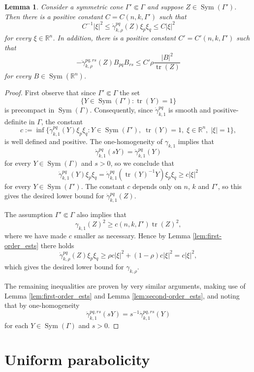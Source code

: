 \documentclass[12pt]{amsart}
\newtheorem{lemma}[theorem]{Lemma}
\DeclareMathOperator{\tr}{tr}
\DeclareMathOperator{\sym}{Sym}
\begin{document}
\begin{lemma}
\label{lem:improved_deriv_bds}
Consider a symmetric cone $\Gamma' \Subset \Gamma$ and suppose $Z \in \sym (\Gamma')$. Then there is a positive constant $C = C(n,k,\Gamma')$ such that 
\[C^{-1} |\xi|^2 \leq \dot \gamma_{k,\rho}^{pq}(Z) \xi_p \xi_q \leq C |\xi|^2\]
for every $\xi \in \mathbb{R}^n$. In addition, there is a positive constant $C' = C'(n,k,\Gamma')$ such that 
\[- \ddot \gamma_{k,\rho}^{pq,rs}(Z) B_{pq} B_{rs} \leq C' \rho\frac{|B|^2}{\tr(Z)}\]
for every $B \in \sym(\mathbb{R}^n)$.
\end{lemma}

\begin{proof}
First observe that since $\Gamma' \Subset \Gamma$ the set
\[ \{Y \in \sym ({\Gamma'}) : \tr(Y) = 1\}\]
is precompact in $\sym(\Gamma)$. Consequently, since $\dot \gamma_{k,1}^{pq}$ is smooth and positive-definite in $\Gamma$, the constant
\[c:= \inf \{\dot \gamma_{k,1}^{pq}(Y) \xi_p \xi_q : Y \in \sym (\Gamma' ), \; \tr(Y) = 1, \; \xi \in \mathbb{R}^{n}, \; |\xi|=1\},\]
is well defined and positive. The one-homogeneity of $\gamma_{k,1}$ implies that 
\[\dot \gamma_{k,1}^{pq}(sY) = \dot \gamma_{k,1}^{pq}(Y)\]
for every $Y \in \sym(\Gamma)$ and $s >0$, so we conclude that 
\[\dot \gamma_{k,1}^{pq}(Y) \xi_p \xi_q = \dot \gamma_{k,1}^{pq}(\tr(Y)^{-1} Y) \xi_p \xi_q \geq c |\xi|^2\]
for every $Y \in \sym (\Gamma')$. The constant $c$ depends only on $n$, $k$ and $\Gamma'$, so this gives the desired lower bound for $\dot \gamma_{k,1}^{pq}(Z)$. 

The assumption $\Gamma' \Subset \Gamma$ also implies that
\[\gamma_{k,1}(Z)^2 \geq c(n,k,\Gamma') \tr(Z)^2,\]
where we have made $c$ smaller as necessary. Hence by Lemma \ref{lem:first-order_ests} there holds
\[\dot \gamma_{k,\rho}^{pq}(Z) \xi_p \xi_q \geq \rho c |\xi|^2 + (1-\rho) c |\xi|^2 = c |\xi|^2,\]
which gives the desired lower bound for $\gamma_{k,\rho}$.

The remaining inequalities are proven by very similar arguments, making use of Lemma \ref{lem:first-order_ests} and Lemma \ref{lem:second-order_ests}, and noting that by one-homogeneity
\[\ddot \gamma_{k,1}^{pq,rs}(sY)= s^{-1} \ddot \gamma_{k,1}^{pq,rs}(Y)\]
for each $Y \in \sym (\Gamma)$ and $s >0$. 
\end{proof}

\section{Uniform parabolicity}
\label{sec:unif_parabolic}
\end{document}
